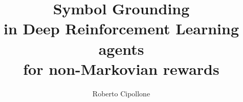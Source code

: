 \documentclass[LaM, binding=1.8cm, noexaminfo]{sapthesis}
\title{Symbol Grounding\\in Deep Reinforcement Learning agents\\for
non-Markovian rewards}
\author{Roberto Cipollone}
\theoremstyle{plain}
\theoremstyle{definition}
\begin{document}
\frontmatter

\maketitle

\dedication{\Large Alla mia famiglia}

\begin{abstract}
	
\end{abstract}

\tableofcontents

\printnomenclature[2cm]

\mainmatter










\backmatter
\printbibliography
\end{document}

